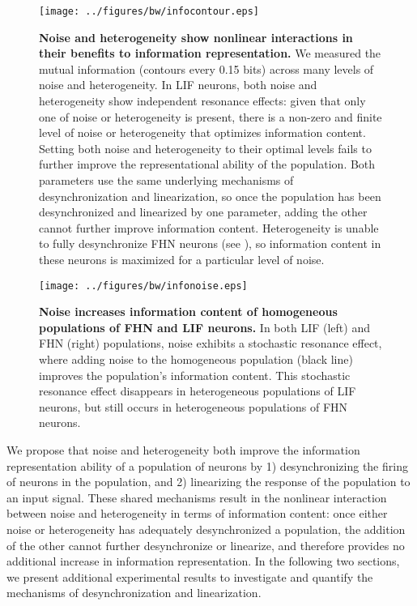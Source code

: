 \documentclass[12pt]{article}
\begin{document}
\begin{figure}
  \ifx\hidefigures\undefined
    \centering
    \texttt{[image: ../figures/bw/infocontour.eps]}
  \fi
  \caption{
    \textbf{Noise and heterogeneity show nonlinear interactions in their benefits to information representation.} We measured the mutual information (contours every 0.15 bits) across many levels of noise and heterogeneity. In LIF neurons, both noise and heterogeneity show independent resonance effects: given that only one of noise or heterogeneity is present, there is a non-zero and finite level of noise or heterogeneity that optimizes information content. Setting both noise and heterogeneity to their optimal levels fails to further improve the representational ability of the population. Both parameters use the same underlying mechanisms of desynchronization and linearization, so once the population has been desynchronized and linearized by one parameter, adding the other cannot further improve information content. Heterogeneity is unable to fully desynchronize FHN neurons (see \textsc{}), so information content in these neurons is maximized for a particular level of noise.
  }
  \label{fig:infocontour}
\end{figure}

\begin{figure}
  \ifx\hidefigures\undefined
    \centering
    \texttt{[image: ../figures/bw/infonoise.eps]}
  \fi
  \caption{
    \textbf{Noise increases information content of homogeneous populations of FHN and LIF neurons.} In both LIF (left) and FHN (right) populations, noise exhibits a stochastic resonance effect, where adding noise to the homogeneous population (black line) improves the population's information content. This stochastic resonance effect disappears in heterogeneous populations of LIF neurons, but still occurs in heterogeneous populations of FHN neurons.
  }
  \label{fig:infonoise}
\end{figure}

We propose that noise and heterogeneity both improve the information representation ability of a population of neurons by 1) desynchronizing the firing of neurons in the population, and 2) linearizing the response of the population to an input signal. These shared mechanisms result in the nonlinear interaction between noise and heterogeneity in terms of information content: once either noise or heterogeneity has adequately desynchronized a population, the addition of the other cannot further desynchronize or linearize, and therefore provides no additional increase in information representation. In the following two sections, we present additional experimental results to investigate and quantify the mechanisms of desynchronization and linearization.
\end{document}
